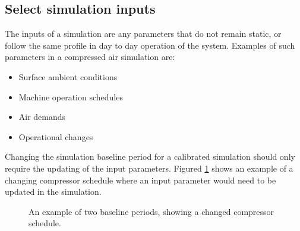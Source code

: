 	\subsection{Select simulation inputs}
		The inputs of a simulation are any parameters that do not remain static, or follow the same profile in day to day operation of the system. Examples of such parameters in a compressed air simulation are:
		\begin{itemize}
			\item Surface ambient conditions
			\item Machine operation schedules
			\item Air demands
			\item Operational changes
		\end{itemize} 
		Changing the simulation baseline period for a calibrated simulation should only require the updating of the input parameters. Figured \ref{fig: Compressor schedule} shows an example of a changing compressor schedule where an input parameter would need to be updated in the simulation.
		\begin{figure}[h]
			\centering
			\fbox{}
			\caption{An example of two baseline periods, showing a changed compressor schedule.}
			\label{fig: Compressor schedule}
		\end{figure}
	
